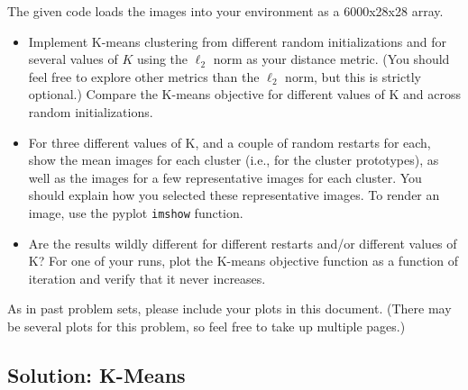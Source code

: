 \documentclass[submit]{harvardml}
\begin{document}
\begin{problem}
The given code loads the images into your environment as a 6000x28x28 array.

\begin{itemize}
    \item Implement K-means clustering
        from different random initializations and for several values of $K$ using the $\ell_2$ norm
        as your distance metric. (You should feel free to explore other metrics than the $\ell_2$
        norm, but this is strictly optional.)  Compare the K-means objective for different values of
        K and across random initializations.
%
\item For three different values of K,
    and a couple of random restarts for each, show the mean images for each cluster (i.e., for the
    cluster prototypes), as well as the images for a few representative images for each cluster. You
    should explain how you selected these representative images. To render an image, use the pyplot
    \texttt{imshow} function. 

\item Are the results wildly different for different restarts and/or different values of K?  For one
    of your runs, plot the K-means objective function as a function of iteration and verify that it
    never increases.

\end{itemize}


As in past problem sets, please include your plots in this
document. (There may be several plots for this problem, so feel free
to take up multiple pages.)




\end{problem}
\subsection*{Solution: K-Means}
\end{document}
